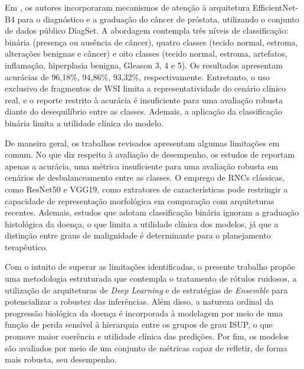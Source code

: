 Em \cite{alici2024efficient}, os autores incorporaram mecanismos de atenção à arquitetura EfficientNet-B4 para o diagnóstico e a graduação do câncer de próstata, utilizando o conjunto de dados público DiagSet. A abordagem contempla três níveis de classificação: binária (presença ou ausência de câncer), quatro classes (tecido normal, estroma, alterações benignas e câncer) e oito classes (tecido normal, estroma, artefatos, inflamação, hiperplasia benigna, Gleason 3, 4 e 5). Os resultados apresentam acurácias de 96,18\%, 94,86\%, 93,32\%, respectivamente. Entretanto, o uso exclusivo de fragmentos de WSI limita a representatividade do cenário clínico real, e o reporte restrito à acurácia é insuficiente para uma avaliação robusta diante do desequilíbrio entre as classes. Ademais, a aplicação da classificação binária limita a utilidade clínica do modelo. 

De maneira geral, os trabalhos revisados apresentam algumas limitações em comum. No que diz respeito à avaliação de desempenho, os estudos de \cite{afifi2024prostate, alici2024efficient} reportam apenas a acurácia, uma métrica insuficiente para uma avaliação robusta em cenários de desbalanceamento entre as classes. O emprego de RNCs clássicas, como ResNet50 e VGG19, como extratores de características \cite{Xiang2023Prostate, kosoko2024xai_prostate} pode restringir a capacidade de representação morfológica em comparação com arquiteturas recentes. Ademais, estudos que adotam classificação binária \cite{afifi2024prostate, alici2024efficient} ignoram a graduação histológica da doença, o que limita a utilidade clínica dos modelos, já que a distinção entre graus de malignidade é determinante para o planejamento terapêutico.

Com o intuito de superar as limitações identificadas, o presente trabalho propõe uma metodologia estruturada que contempla o tratamento de rótulos ruidosos, a utilização de arquiteturas de \textit{Deep Learning} e de estratégias de \textit{Ensemble} para potencializar a robustez das inferências. Além disso, a natureza ordinal da progressão biológica da doença é incorporada à modelagem por meio de uma função de perda sensível à hierarquia entre os grupos de grau ISUP, o que promove maior coerência e utilidade clínica das predições. Por fim, os modelos são avaliados por meio de um conjunto de métricas capaz de refletir, de forma mais robusta, seu desempenho.